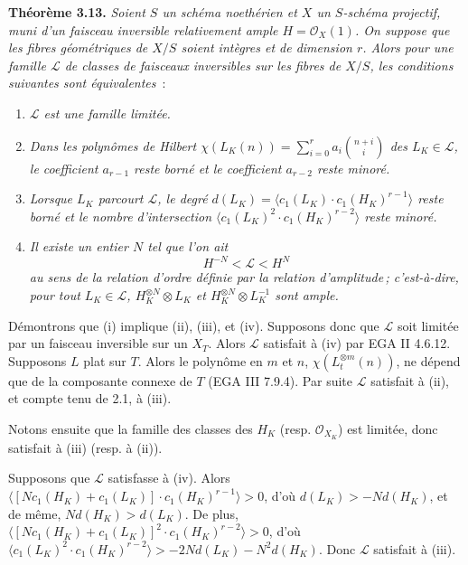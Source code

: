 \textbf{Th\'eor\`eme 3.13.} \emph{Soient \(S\) un sch\'ema noeth\'erien et \(X\) un \(S\)-sch\'ema projectif, muni d'un faisceau inversible relativement ample \(H=\mathcal O_X(1)\). On suppose que les fibres g\'eom\'etriques de \(X/S\) soient int\`egres et de dimension \(r\). Alors pour une famille \(\mathcal L\) de classes de faisceaux inversibles sur les fibres de \(X/S\), les conditions suivantes sont \'equivalentes}~:
\begin{enumerate}[label=(\roman*)]
\item \emph{\(\mathcal L\) est une famille limit\'ee.}
\item \emph{Dans les polyn\^omes de Hilbert \(\chi(L_K(n))=\sum_{i=0}^{r}a_i\binom{n+i}{i}\) des \(L_K\in\mathcal L\), le coefficient \(a_{r-1}\) reste born\'e et le coefficient \(a_{r-2}\) reste minor\'e.}
\item \emph{Lorsque \(L_K\) parcourt \(\mathcal L\), le degr\'e \(d(L_K)=\langle c_1(L_K)\cdot c_1(H_K)^{r-1}\rangle\) reste born\'e et le nombre d'intersection \(\langle c_1(L_K)^2\cdot c_1(H_K)^{r-2}\rangle\) reste minor\'e.}
\item \emph{Il existe un entier \(N\) tel que l'on ait}
\[
H^{-N}<\mathcal L<H^N
\]
\emph{au sens de la relation d'ordre d\'efinie par la relation d'amplitude\,; c'est-\`a-dire, pour tout \(L_K\in\mathcal L\), \(H_K^{\otimes N}\otimes L_K\) et \(H_K^{\otimes N}\otimes L_K^{-1}\) sont ample.}
\end{enumerate}

D\'
emontrons que (i) implique (ii), (iii), et (iv). Supposons donc que \(\mathcal L\) soit limit\'ee par un faisceau inversible sur un \(X_T\). Alors \(\mathcal L\) satisfait \`a (iv) par EGA II 4.6.12. Supposons \(L\) plat sur \(T\). Alors le polyn\^ome en \(m\) et \(n\), \(\chi(L_t^{\otimes m}(n))\), ne d\'epend que de la composante connexe de \(T\) (EGA III 7.9.4). Par suite \(\mathcal L\) satisfait \`a (ii), et compte tenu de 2.1, \`a (iii).

Notons ensuite que la famille des classes des \(H_K\) (resp. \(\mathcal O_{X_K}\)) est limit\'ee, donc satisfait \`a (iii) (resp. \`a (ii)).

Supposons que \(\mathcal L\) satisfasse \`a (iv). Alors \(\langle [N c_1(H_K)+c_1(L_K)]\cdot c_1(H_K)^{r-1}\rangle>0\), d'o\`u \(d(L_K)>-Nd(H_K)\), et de m\^eme, \(Nd(H_K)>d(L_K)\). De plus, \(\langle [N c_1(H_K)+c_1(L_K)]^2\cdot c_1(H_K)^{r-2}\rangle>0\), d'o\`u \(\langle c_1(L_K)^2\cdot c_1(H_K)^{r-2}\rangle>-2Nd(L_K)-N^2d(H_K)\). Donc \(\mathcal L\) satisfait \`a (iii).

